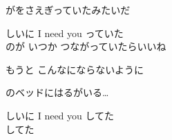 {がをさえぎっていたみたいだ

しいに I need you っていた
\\

のが いつか つながっていたらいいね

もうと こんなにならないように

のベッドにはるがいる…

しいに I need you してた
\\

してた

}